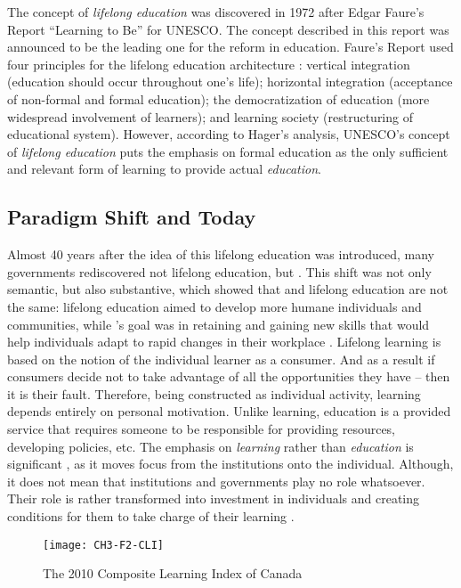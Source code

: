 The concept of \textit{lifelong education} was discovered in 1972 after Edgar Faure's
Report ``Learning to Be'' for UNESCO. The concept described in this report was
announced to be the leading one for the reform in education. Faure's Report used
four principles for the lifelong education architecture \citep{Faure1972}:
vertical integration (education should occur throughout one's life); horizontal
integration (acceptance of non-formal and formal education); the democratization
of education (more widespread involvement of learners); and learning society
(restructuring of educational system). However, according to Hager's
\citeyearpar{Hager2011} analysis, UNESCO's concept of \textit{lifelong
education} puts the emphasis on formal education as the only sufficient and
relevant form of learning to provide actual \textit{education}.

\subsection{Paradigm Shift and \LLLc Today}

Almost 40 years after the idea of this lifelong education was introduced, many
governments rediscovered not lifelong education, but \LLLs \citep{Boshier2000}.
This shift was not only semantic, but also substantive, which showed that \LLLs
and lifelong education are not the same: lifelong education aimed to develop
more humane individuals and communities, while \LLLsn's goal was in retaining
and gaining new skills that would help individuals adapt to rapid changes in
their workplace \citep{Medel-Anonuevo2001}. Lifelong learning is based on the
notion of the individual learner as a consumer. And as a result if consumers
decide not to take advantage of all the opportunities they have -- then it is
their fault. Therefore, being constructed as individual activity, learning
depends entirely on personal motivation. Unlike learning, education is a
provided service \citep{Boshier2000} that requires someone to be responsible for
providing resources, developing policies, etc. The emphasis on \textit{learning}
rather than \textit{education} is significant \citep{Tuijnman2002}, as it moves
focus from the institutions onto the individual. Although, it does not mean that
institutions and governments play no role whatsoever. Their role is rather
transformed into investment in individuals and creating conditions for them to
take charge of their learning \citep{Chen2009}.

\begin{figure}[htb]
\centering 
\texttt{[image: CH3-F2-CLI]}
\caption[The 2010 Composite Learning Index of Canada]{The 2010 Composite
Learning Index of Canada \citep{CanadianCouncilonLearning2011}}
\label{fig:cli2010}
\end{figure}

